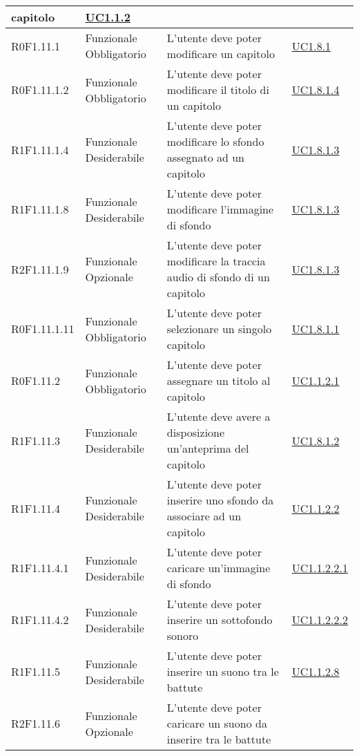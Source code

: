 \begin{center}
\begin{longtable}{| p{2.5cm} | p{3cm} | p{5.25cm} | p{2cm} |}
capitolo &  \hyperref[sec:UC1.1.2]{ UC1.1.2 }  \\ \hline  R0F1.11.1 & Funzionale \newline Obbligatorio & L'utente deve poter modificare un capitolo &  \hyperref[sec:UC1.8.1]{ UC1.8.1 }  \\ \hline  R0F1.11.1.2 & Funzionale \newline Obbligatorio & L'utente deve poter modificare il titolo di un capitolo &  \hyperref[sec:UC1.8.1.4]{ UC1.8.1.4 }  \\ \hline  R1F1.11.1.4 & Funzionale \newline Desiderabile & L'utente deve poter modificare lo sfondo assegnato ad un capitolo &  \hyperref[sec:UC1.8.1.3]{ UC1.8.1.3 }  \\ \hline  R1F1.11.1.8 & Funzionale \newline Desiderabile & L'utente deve poter modificare l'immagine di sfondo &  \hyperref[sec:UC1.8.1.3]{ UC1.8.1.3 }  \\ \hline  R2F1.11.1.9 & Funzionale \newline Opzionale & L'utente deve poter modificare la traccia audio di sfondo di un capitolo &  \hyperref[sec:UC1.8.1.3]{ UC1.8.1.3 }  \\ \hline  R0F1.11.1.11 & Funzionale \newline Obbligatorio & L'utente deve poter selezionare un singolo capitolo &  \hyperref[sec:UC1.8.1.1]{ UC1.8.1.1 }  \\ \hline  R0F1.11.2 & Funzionale \newline Obbligatorio & L'utente deve poter assegnare un titolo al capitolo &  \hyperref[sec:UC1.1.2.1]{ UC1.1.2.1 }  \\ \hline  R1F1.11.3 & Funzionale \newline Desiderabile & L'utente deve avere a disposizione un'anteprima del capitolo &  \hyperref[sec:UC1.8.1.2]{ UC1.8.1.2 }  \\ \hline  R1F1.11.4 & Funzionale \newline Desiderabile & L'utente deve poter inserire uno sfondo da associare ad un capitolo &  \hyperref[sec:UC1.1.2.2]{ UC1.1.2.2 }  \\ \hline  R1F1.11.4.1 & Funzionale \newline Desiderabile & L'utente deve poter caricare un'immagine di sfondo &  \hyperref[sec:UC1.1.2.2.1]{ UC1.1.2.2.1 }  \\ \hline  R1F1.11.4.2 & Funzionale \newline Desiderabile & L'utente deve poter inserire un sottofondo sonoro &  \hyperref[sec:UC1.1.2.2.2]{ UC1.1.2.2.2 }  \\ \hline  R1F1.11.5 & Funzionale \newline Desiderabile & L'utente deve poter inserire un suono tra le battute &  \hyperref[sec:UC1.1.2.8]{ UC1.1.2.8 }  \\ \hline  R2F1.11.6 & Funzionale \newline Opzionale & L'utente deve poter caricare un suono da inserire tra le battute &  \hyperref[sec:UC1.1.2.8]{ 
\end{longtable}
\end{center}
